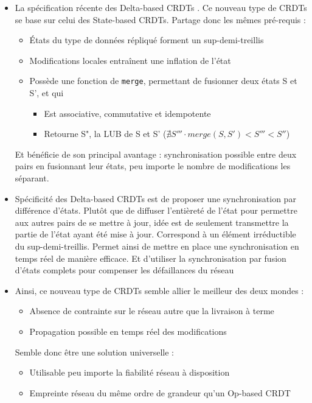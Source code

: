 \begin{itemize}
    \item La spécification récente des Delta-based CRDTs .
      Ce nouveau type de CRDTs se base sur celui des State-based CRDTs.
      Partage donc les mêmes pré-requis :
      \begin{itemize}
        \item États du type de données répliqué forment un sup-demi-treillis
        \item Modifications locales entraînent une inflation de l'état
        \item Possède une fonction de \texttt{merge}, permettant de fusionner deux états S et S', et qui
        \begin{itemize}
          \item Est associative, commutative et idempotente
          \item Retourne S", la \ac{LUB} de S et S' (\ie $\nexists S''' \cdot merge(S, S') < S''' < S''$)
        \end{itemize}
      \end{itemize}
      Et bénéficie de son principal avantage : synchronisation possible entre deux pairs en fusionnant leur états, peu importe le nombre de modifications les séparant.
    \item Spécificité des Delta-based CRDTs est de proposer une synchronisation par différence d'états.
      Plutôt que de diffuser l'entièreté de l'état pour permettre aux autres pairs de se mettre à jour, idée est de seulement transmettre la partie de l'état ayant été mise à jour.
      Correspond à un élément irréductible du sup-demi-treillis.
      Permet ainsi de mettre en place une synchronisation en temps réel de manière efficace.
      Et d'utiliser la synchronisation par fusion d'états complets pour compenser les défaillances du réseau
    \item Ainsi, ce nouveau type de CRDTs semble allier le meilleur des deux mondes :
      \begin{itemize}
        \item Absence de contrainte sur le réseau autre que la livraison à terme
        \item Propagation possible en temps réel des modifications
      \end{itemize}
      Semble donc être une solution universelle :
      \begin{itemize}
        \item Utilisable peu importe la fiabilité réseau à disposition
        \item Empreinte réseau du même ordre de grandeur qu'un Op-based CRDT

\end{itemize}
\end{itemize}

